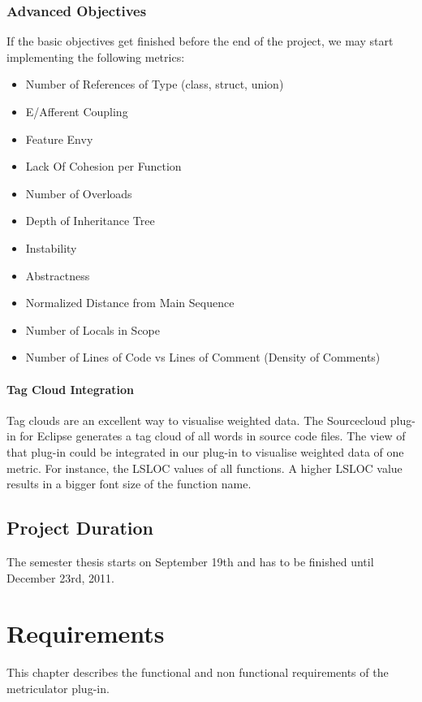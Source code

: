 \documentclass[11pt,a4paper,oneside]{scrreprt}
\begin{document}
\subsection{Advanced Objectives}\label{advobjectives}
If the basic objectives get finished before the end of the project, we may start implementing the following metrics:
\begin{itemize}
\item Number of References of Type (class, struct, union)
\item E/Afferent Coupling
\item Feature Envy
\item Lack Of Cohesion per Function
\item Number of Overloads
\item Depth of Inheritance Tree
\item Instability
\item Abstractness
\item Normalized Distance from Main Sequence
\item Number of Locals in Scope
\item Number of Lines of Code vs Lines of Comment (Density of Comments)
\end{itemize}

\subsubsection{Tag Cloud Integration}
Tag clouds are an excellent way to visualise weighted data. The Sourcecloud plug-in for Eclipse \cite{sourcecloud_git} generates a tag cloud of all words in source code files. The view of that plug-in could be integrated in our plug-in to visualise weighted data of one metric. For instance, the LSLOC values of all functions. A higher LSLOC value results in a bigger font size of the function name.

\section{Project Duration}
The semester thesis starts on September 19th and has to be finished until December 23rd, 2011.

\chapter{Requirements}\label{requirements}
This chapter describes the functional and non functional requirements of the metriculator plug-in.
\end{document}

